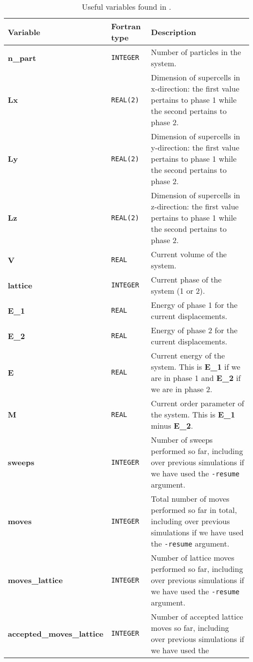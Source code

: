 \documentclass{report}
\begin{document}
\begin{landscape}
\begin{center}\label{table:state_variables}
\begin{longtable}{ l l p{8cm}}
\caption{Useful variables found in .}
\\

Variable & Fortran type & Description \\
\hline
\textbf{n\_part} & \texttt{INTEGER} & Number of particles in the system. \\
\textbf{Lx} & \texttt{REAL(2)} & Dimension of supercells in x-direction: the first value pertains to phase 1 while the second pertains to phase 2.\\
\textbf{Ly} & \texttt{REAL(2)} & Dimension of supercells in y-direction: the first value pertains to phase 1 while the second pertains to phase 2.\\
\textbf{Lz} & \texttt{REAL(2)} & Dimension of supercells in z-direction: the first value pertains to phase 1 while the second pertains to phase 2.\\
\textbf{V} & \texttt{REAL} & Current volume of the system.\\
\textbf{lattice} & \texttt{INTEGER} & Current phase of the system (1 or 2).\\
\textbf{E\_1} & \texttt{REAL} & Energy of phase 1 for the current displacements. \\
\textbf{E\_2} & \texttt{REAL} & Energy of phase 2 for the current displacements. \\
\textbf{E} & \texttt{REAL} & Current energy of the system. This is \textbf{E\_1} if we are in phase 1 and \textbf{E\_2} if we are in phase 2.\\
\textbf{M} & \texttt{REAL} & Current order parameter of the system. This is \textbf{E\_1} minus \textbf{E\_2}.\\
\textbf{sweeps} & \texttt{INTEGER} & Number of sweeps performed so far, including over previous simulations if we have used the \texttt{-resume} argument.\\
\textbf{moves} & \texttt{INTEGER} & Total number of moves performed so far in total, including over previous simulations if we have used the \texttt{-resume} 
argument.\\
\textbf{moves\_lattice} & \texttt{INTEGER} & Number of lattice moves performed so far, including over previous simulations if we have used the 
 \texttt{-resume} argument.\\
\textbf{accepted\_moves\_lattice} & \texttt{INTEGER} & Number of accepted lattice moves so far, including over previous simulations if we have used the 

\end{longtable}
\end{center}
\end{landscape}
\end{document}
